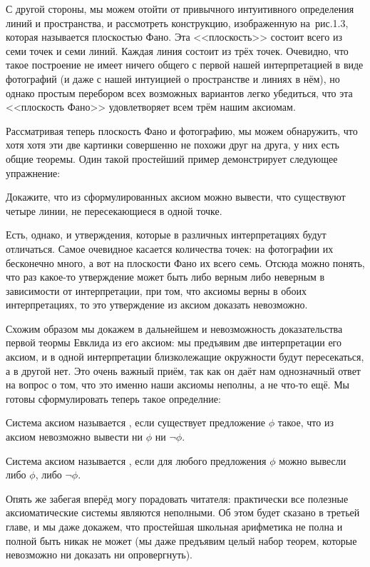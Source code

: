 С другой стороны, мы можем отойти от привычного интуитивного определения линий и пространства, и рассмотреть конструкцию, изображенную на~рис.1.3, которая называется плоскостью Фано. Эта <<плоскость>> состоит всего из семи точек и семи линий. Каждая линия состоит из трёх точек. Очевидно, что такое построение не имеет ничего общего с первой нашей интерпретацией в виде фотографий (и даже с нашей интуицией о пространстве и линиях в нём), но однако простым перебором всех возможных вариантов легко убедиться, что эта <<плоскость Фано>> удовлетворяет всем трём нашим аксиомам.

Рассматривая теперь плоскость Фано и фотографию, мы можем обнаружить, что хотя хотя эти две картинки совершенно не похожи друг на друга, у них есть общие теоремы. Один такой простейший пример демонстрирует следующее упражнение:

\begin{exercise}
Докажите, что из сформулированных аксиом можно вывести, что существуют четыре линии, не пересекающиеся в одной точке.
\end{exercise}

Есть, однако, и утверждения, которые в различных интерпретациях будут отличаться. Самое очевидное касается количества точек: на фотографии их бесконечно много, а вот на плоскости Фано их всего семь. Отсюда можно понять, что раз какое-то утверждение может быть либо верным либо неверным в зависимости от интерпретации, при том, что аксиомы верны в обоих интерпретациях, то это утверждение из аксиом доказать невозможно.

Схожим образом мы докажем в дальнейшем и невозможность доказательства первой теормы Евклида из его аксиом: мы предъявим две интерпретации его аксиом, и в одной интерпретации близколежащие окружности будут пересекаться, а в другой нет. Это очень важный приём, так как он даёт нам однозначный ответ на вопрос о том, что это именно наши аксиомы неполны, а не что-то ещё. Мы готовы сформулировать теперь такое определние:

\begin{definition}
Система аксиом называется , если существует предложение $\phi$ такое, что из аксиом невозможно вывести ни $\phi$ ни $\neg\phi$.
\end{definition}

\begin{definition}
Система аксиом называется , если для любого предложения $\phi$ можно вывесли либо $\phi$, либо $\neg\phi$.
\end{definition}

Опять же забегая вперёд могу порадовать читателя: практически все полезные аксиоматические системы являются неполными. Об этом будет сказано в третьей главе, и мы даже докажем, что простейшая школьная арифметика не полна и полной быть никак не может (мы даже предъявим целый набор теорем, которые невозможно ни доказать ни опровергнуть).

